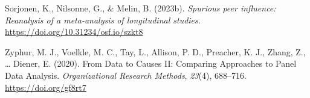 \documentclass[
  man,floatsintext]{apa6}
\newlength{\cslhangindent}
\newenvironment{CSLReferences}[2] %
 {\begin{list}{}{%
  \setlength{\itemindent}{0pt}
  \setlength{\leftmargin}{0pt}
  \setlength{\parsep}{0pt}
  \ifodd #1
   \setlength{\leftmargin}{\cslhangindent}
   \setlength{\itemindent}{-1\cslhangindent}
  \fi
  \setlength{\itemsep}{#2\baselineskip}}}
 {\end{list}}
\begin{document}
\begin{CSLReferences}{1}{0}
Sorjonen, K., Nilsonne, G., \& Melin, B. (2023b). \emph{Spurious peer influence: {Reanalysis} of a meta-analysis of longitudinal studies}. \url{https://doi.org/10.31234/osf.io/szkt8}

Zyphur, M. J., Voelkle, M. C., Tay, L., Allison, P. D., Preacher, K. J., Zhang, Z., \ldots{} Diener, E. (2020). From {Data} to {Causes II}: {Comparing Approaches} to {Panel Data Analysis}. \emph{Organizational Research Methods}, \emph{23}(4), 688--716. \url{https://doi.org/gf8rt7}

\end{CSLReferences}
\end{document}
